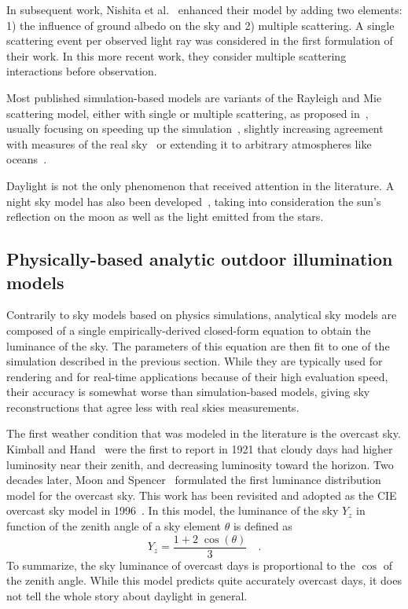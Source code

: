 In subsequent work, Nishita et al.~\cite{nishita1996display} enhanced their model by adding two elements: 1) the influence of ground albedo on the sky and 2) multiple scattering. A single scattering event per observed light ray was considered in the first formulation of their work. In this more recent work, they consider multiple scattering interactions before observation.

Most published simulation-based models are variants of the Rayleigh and Mie scattering model, either with single or multiple scattering, as proposed in~\cite{nishita1993display,nishita1996display}, usually focusing on speeding up the simulation~\cite{oneal2005accurate}, slightly increasing agreement with measures of the real sky~\cite{haber2005physically,bruneton2008precomputed} or extending it to arbitrary atmospheres like oceans~\cite{elek2010real}.

Daylight is not the only phenomenon that received attention in the literature. A night sky model has also been developed~\cite{jensen2001nightskymodel}, taking into consideration the sun's reflection on the moon as well as the light emitted from the stars.

\subsection{Physically-based analytic outdoor illumination models}

Contrarily to sky models based on physics simulations, analytical sky models are composed of a single empirically-derived closed-form equation to obtain the luminance of the sky. The parameters of this equation are then fit to one of the simulation described in the previous section. While they are typically used for rendering and for real-time applications because of their high evaluation speed, their accuracy is somewhat worse than simulation-based models, giving sky reconstructions that agree less with real skies measurements.

The first weather condition that was modeled in the literature is the overcast sky. Kimball and Hand~\cite{kimball1921sky} were the first to report in 1921 that cloudy days had higher luminosity near their zenith, and decreasing luminosity toward the horizon. Two decades later, Moon and Spencer~\cite{moon1942illumination} formulated the first luminance distribution model for the overcast sky. This work has been revisited and adopted as the CIE overcast sky model in 1996~\cite{cie1996s}. In this model, the luminance of the sky $Y_z$ in function of the zenith angle of a sky element $\theta$ is defined as
\begin{equation}
Y_z = \frac{1 + 2 \; \cos\left( \theta \right)}{3} \quad.
\end{equation}
To summarize, the sky luminance of overcast days is proportional to the $\cos$ of the zenith angle. While this model predicts quite accurately overcast days, it does not tell the whole story about daylight in general.

